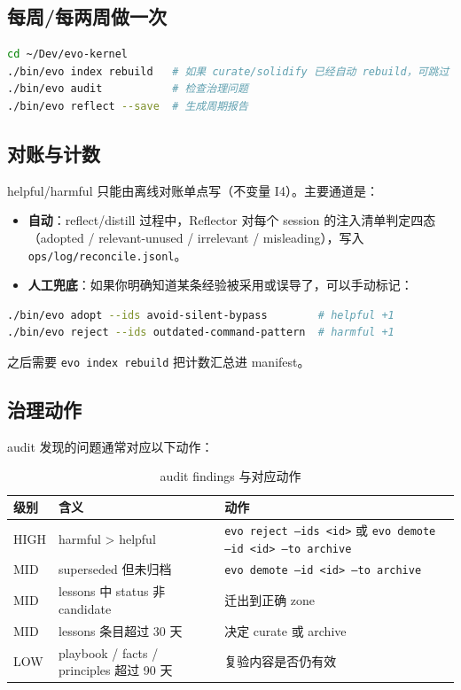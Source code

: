 \documentclass[12pt,a4paper]{ctexart}
\begin{document}
\subsection{每周/每两周做一次}

\begin{lstlisting}[language=bash]
cd ~/Dev/evo-kernel
./bin/evo index rebuild   # 如果 curate/solidify 已经自动 rebuild，可跳过
./bin/evo audit           # 检查治理问题
./bin/evo reflect --save  # 生成周期报告
\end{lstlisting}

\subsection{对账与计数}

helpful/harmful 只能由离线对账单点写（不变量 I4）。主要通道是：

\begin{itemize}
  \item \textbf{自动}：reflect/distill 过程中，Reflector 对每个 session 的注入清单判定四态（adopted / relevant-unused / irrelevant / misleading），写入 \texttt{ops/log/reconcile.jsonl}。
  \item \textbf{人工兜底}：如果你明确知道某条经验被采用或误导了，可以手动标记：
\end{itemize}

\begin{lstlisting}[language=bash]
./bin/evo adopt --ids avoid-silent-bypass        # helpful +1
./bin/evo reject --ids outdated-command-pattern  # harmful +1
\end{lstlisting}

之后需要 \texttt{evo index rebuild} 把计数汇总进 manifest。

\subsection{治理动作}

audit 发现的问题通常对应以下动作：

\begin{table}[H]
\centering
\caption{audit findings 与对应动作}
\begin{tabular}{@{}lp{3.8cm}p{6.2cm}@{}}
\toprule
\textbf{级别} & \textbf{含义} & \textbf{动作} \\
\midrule
HIGH & harmful > helpful & \texttt{evo reject --ids <id>} 或 \texttt{evo demote --id <id> --to archive} \\
MID & superseded 但未归档 & \texttt{evo demote --id <id> --to archive} \\
MID & lessons 中 status 非 candidate & 迁出到正确 zone \\
MID & lessons 条目超过 30 天 & 决定 curate 或 archive \\
LOW & playbook / facts / principles 超过 90 天 & 复验内容是否仍有效 \\
\bottomrule
\end{tabular}
\end{table}
\end{document}
